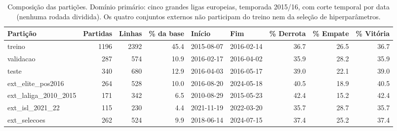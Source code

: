 \begin{table}[htbp]
\centering
\caption{Composição das partições. Domínio primário: cinco grandes ligas europeias, temporada 2015/16, com corte temporal por data (nenhuma rodada dividida). Os quatro conjuntos externos não participam do treino nem da seleção de hiperparâmetros.}
\label{tab:particoes}
\small
\begin{tabular}{lrrrllrrr}
\toprule
Partição & Partidas & Linhas & \% da base & Início & Fim & \% Derrota & \% Empate & \% Vitória \\
\midrule
treino & 1196 & 2392 & 45.4 & 2015-08-07 & 2016-02-14 & 36.7 & 26.5 & 36.7 \\
validacao & 287 & 574 & 10.9 & 2016-02-17 & 2016-04-02 & 35.9 & 28.2 & 35.9 \\
teste & 340 & 680 & 12.9 & 2016-04-03 & 2016-05-17 & 39.0 & 22.1 & 39.0 \\
ext\_elite\_pos2016 & 264 & 528 & 10.0 & 2016-08-20 & 2024-05-18 & 40.5 & 18.9 & 40.5 \\
ext\_laliga\_2010\_2015 & 171 & 342 & 6.5 & 2010-08-29 & 2015-05-23 & 42.4 & 15.2 & 42.4 \\
ext\_isl\_2021\_22 & 115 & 230 & 4.4 & 2021-11-19 & 2022-03-20 & 35.7 & 28.7 & 35.7 \\
ext\_selecoes & 262 & 524 & 9.9 & 2018-06-14 & 2024-07-15 & 37.4 & 25.2 & 37.4 \\
\bottomrule
\end{tabular}
\end{table}
